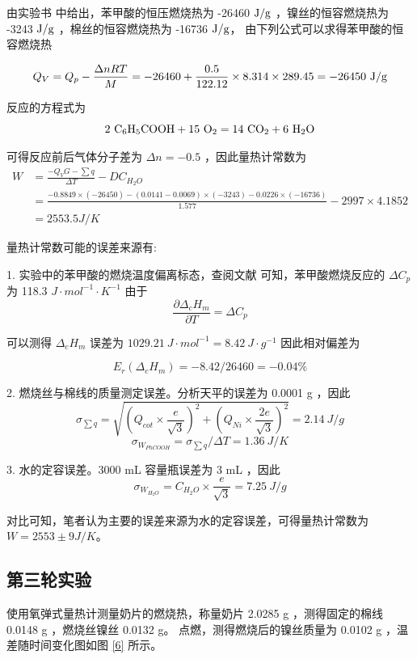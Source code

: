 \documentclass[cn,hazy,pku,12pt,normal,math=newtx,cite=super]{elegantnote}
\begin{document}
由实验书 \cite{pcl2002} 中给出，苯甲酸的恒压燃烧热为 -26460 $\rm J/g$ ，镍丝的恒容燃烧热为 -3243 $\rm J/g$ ，棉丝的恒容燃烧热为 -16736 $\rm J/g$，
由下列公式可以求得苯甲酸的恒容燃烧热

$$
Q_V = Q_p - \frac{\Delta nRT}{M} = - 26460 + \frac{0.5}{122.12} \times 8.314 \times 289.45 = -26450\ {\rm J/g}
$$

反应的方程式为
$$
\rm 2\ C_6H_5COOH + 15\ O_2 = 14\ CO_2 + 6\ H_2O
$$

可得反应前后气体分子差为 $ \Delta n = -0.5 $ ，因此量热计常数为
\begin{equation*}
    \begin{split}
        W &=\frac{-Q_VG-\sum{q}}{\Delta T}-DC_{H_2O} \\
          &= \frac{-0.8849 \times (-26450) - (0.0141-0.0069)\times (-3243) -  0.0226 \times (- 16736) }{1.577}-2997 \times 4.1852 \\ 
          &= 2553.5 J/K
    \end{split}
\end{equation*}

量热计常数可能的误差来源有:

1. 实验中的苯甲酸的燃烧温度偏离标态，查阅文献 \cite{CRC} 可知，苯甲酸燃烧反应的 $\Delta C_p$ 为 118.3 $J \cdot mol^{-1} \cdot K^{-1}$
由于
$$
\frac{\partial \Delta_cH_m}{\partial T} =\Delta C_p
$$

可以测得 $\Delta_cH_m$ 误差为 $ 1029.21\ J \cdot mol^{-1} = 8.42\ J \cdot g^{-1}$ 因此相对偏差为

$$
E_r(\Delta_cH_m) = - 8.42/26460 = - 0.04\%
$$

2. 燃烧丝与棉线的质量测定误差。分析天平的误差为 0.0001 g ，因此
$$
\sigma_{\sum q} = \sqrt{(Q_{cot} \times \frac{e}{\sqrt{3}})^2 + (Q_{Ni} \times \frac{2e}{\sqrt{3}})^2}  = 2.14\ J/g
$$
$$
\sigma_{W_{PhCOOH}} = \sigma_{\sum q} / \Delta T = 1.36\ J/K
$$

3. 水的定容误差。3000 mL 容量瓶误差为 3 mL ，因此
$$
\sigma_{W_{H_2O}} = C_{H_2O} \times \frac{e}{\sqrt{3}}  = 7.25\ J/g
$$

对比可知，笔者认为主要的误差来源为水的定容误差，可得量热计常数为 $ W = 2553 \pm 9 J/K$。

\subsection[short]{第三轮实验}

使用氧弹式量热计测量奶片的燃烧热，称量奶片 2.0285 g ，测得固定的棉线 0.0148 g ，燃烧丝镍丝 0.0132 g。
点燃，测得燃烧后的镍丝质量为 0.0102 g ，温差随时间变化图如图 \ref{6} 所示。
\end{document}
